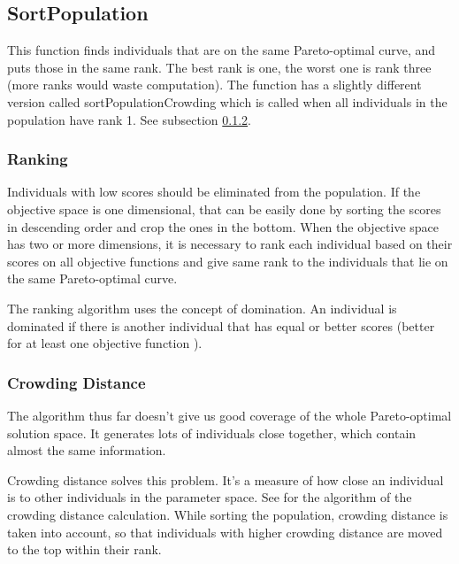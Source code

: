 \subsection{SortPopulation} \label{sortPopulation}
This function finds individuals that are on the same Pareto-optimal curve, and puts those in the same rank. The best rank is one, the worst one is rank three (more ranks would waste computation). The function has a slightly different version called sortPopulationCrowding which is called when all individuals in the population have rank 1. See subsection \ref{crowdingDistance}. 

\subsubsection{Ranking}
Individuals with low scores should be eliminated from the population. If the objective space is one dimensional, that can be easily done by sorting the scores in descending order and crop the ones in the bottom. When the objective space has two or more dimensions,  it is necessary to rank each individual based on their scores on all objective functions and give same rank to the individuals that lie on the same Pareto-optimal curve.

The ranking algorithm uses the concept of domination. An individual is dominated if there is another individual that has equal or better scores (better for at least one objective function ).

\subsubsection{Crowding Distance} \label{crowdingDistance}
The algorithm thus far doesn't give us good coverage of the whole Pareto-optimal solution space. It generates lots of individuals close together, which contain almost the same information. 

Crowding distance solves this problem. It's a measure of how close an individual is to other individuals in the parameter space. See  for the algorithm of the crowding distance calculation. While sorting the population, crowding distance is taken into account, so that individuals with higher crowding distance are moved to the top within their rank.


